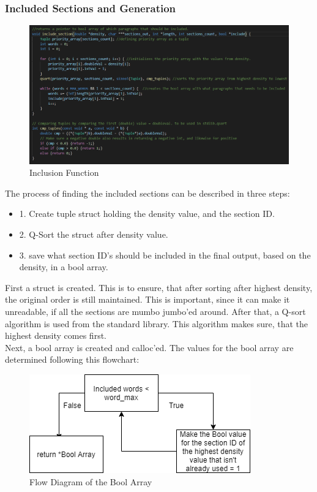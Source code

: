 \subsubsection{Included Sections and Generation}
\begin{figure}[H]
  \centering
  \includegraphics[scale = 0.6]{figures/includefunction.png}
  \caption{Inclusion Function}
\end{figure}
The process of finding the included sections can be described in three steps:
\begin{itemize}
  \item 1. Create tuple struct holding the density value, and the section ID.
  \item 2. Q-Sort the struct after density value.
  \item 3. save what section ID's should be included in the final output, based on the density, in a bool array.
\end{itemize}
First a struct is created. This is to ensure, that after sorting after highest density, the original order is still maintained.
This is important, since it can make it unreadable, if all the sections are mumbo jumbo'ed around. %
After that, a Q-sort algorithm is used from the standard library. This algorithm makes sure, that the highest density comes first.
\\
Next, a bool array is created and calloc'ed. The values for the bool array are determined following this flowchart:
\begin{figure}[H]
  \centering
  \includegraphics[scale = 0.6]{figures/include_flow.png}
  \caption{Flow Diagram of the Bool Array}
\end{figure} 
